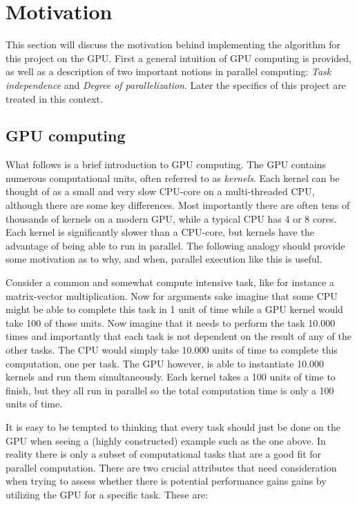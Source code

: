 \section{Motivation}
This section will discuss the motivation behind implementing the algorithm for this project on the GPU. First a general intuition of GPU computing is provided, as well as a description of two important notions in parallel computing: \emph{Task independence} and \emph{Degree of parallelization}. Later the specifics of this project are treated in this context.

\subsection{GPU computing}
What follows is a brief introduction to GPU computing. The GPU contains numerous computational units, often referred to as \emph{kernels}. Each kernel can be thought of as a small and very slow CPU-core on a multi-threaded CPU, although there are some key differences. Most importantly there are often tens of thousands of kernels on a modern GPU, while a typical CPU has 4 or 8 cores. Each kernel is significantly slower than a CPU-core, but kernels have the advantage of being able to run in parallel. The following analogy should provide some motivation as to why, and when, parallel execution like this is useful.

Consider a common and somewhat compute intensive task, like for instance a matrix-vector multiplication. 
Now for arguments sake imagine that some CPU might be able to complete this task in 1 unit of time while a GPU kernel would take 100 of those units. Now imagine that it needs to perform the task 10.000 times and importantly that each task is not dependent on the result of any of the other tasks. The CPU would simply take 10.000 units of time to complete this computation, one per task. The GPU however, is able to instantiate 10.000 kernels and run them simultaneously. Each kernel takes a 100 units of time to finish, but they all run in parallel so the total computation time is only a 100 units of time.

It is easy to be tempted to thinking that every task should just be done on the GPU when seeing a (highly constructed) example such as the one above. In reality there is only a subset of computational tasks that are a good fit for parallel computation. There are two crucial attributes that need consideration when trying to assess whether there is potential performance gains gains by utilizing the GPU for a specific task. These are:

